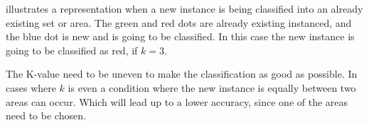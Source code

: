 \bigskip

 illustrates a representation when a new instance is being classified into an already existing set or area.
The green and red dots are already existing instanced, and the blue dot is new and is going to be classified.
In this case the new instance is going to be classified as red, if $k=3$.


\bigskip

The K-value need to be uneven to make the classification as good as possible. 
In cases where $k$ is even a condition where the new instance is equally between two areas can occur.
Which will lead up to a lower accuracy, since one of the areas need to be chosen.

